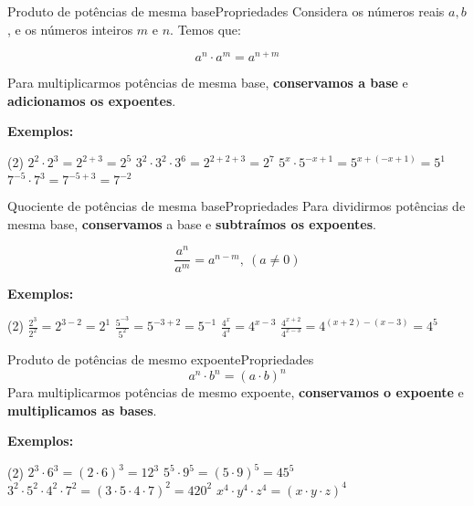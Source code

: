\documentclass[aspectratio=169,11pt]{uu-beamer}
\begin{document}
    \begin{frame}{Produto de potências de mesma base}{Propriedades}
        Considera os números reais \(a,b\), e os números inteiros \(m\) e \(n\). Temos que:
        
        \[a^n \cdot a^m = a^{n + m}\]
        
        Para multiplicarmos potências de mesma base, \textbf{conservamos a base} e \textbf{adicionamos os expoentes}.
        \vspace{.5cm}
        
        \textbf{Exemplos:}
        
        \begin{tasks}(2)
            \task \(2^2 \cdot 2^3 = 2^{2+3} = 2^5\)
            \task \(3^2 \cdot 3^2 \cdot 3^6 = 2^{2+2+3} = 2^7\)
            \task \(5^x \cdot 5^{-x+1} = 5^{x + (-x+1)} = 5^1\)
            \task \(7^{-5} \cdot 7^{3} = 7^{-5+3} = 7^{-2}\)
        \end{tasks}
        
    \end{frame}
    
    \begin{frame}{Quociente de potências de mesma base}{Propriedades}
        Para dividirmos potências de mesma base, \textbf{conservamos} a base e \textbf{subtraímos os expoentes}.
        
        \[\frac{a^n}{a^m} = a^{n-m}, ~(a \neq 0)\]
        
        \vspace{1cm}
        \textbf{Exemplos:}
        
        \begin{tasks}(2)
            \task \(\frac{2^3}{2^2} = 2^{3-2} = 2^1\)
            \task \(\frac{5^{-3}}{5^{2}} = 5^{-3+2} = 5^{-1}\)
            \task \(\frac{4^x}{4^3} = 4^{x-3}\)
            \task \(\frac{4^{x+2}}{4^{x-3}} = 4^{(x+2)-(x-3)} = 4^{5}\)
        \end{tasks}
    \end{frame}
    
    \begin{frame}{Produto de potências de mesmo expoente}{Propriedades}
        \[a^n \cdot b^n = (a \cdot b)^n\]
        Para multiplicarmos potências de mesmo expoente, \textbf{conservamos o expoente} e \textbf{multiplicamos as bases}.
        
        \vspace{1cm}
        \textbf{Exemplos:}
        
        \begin{tasks}(2)
            \task \(2^3 \cdot 6^3 = (2 \cdot 6)^3 = 12^3\)
            \task \(5^5 \cdot 9^5 = (5 \cdot 9)^5 = 45^5\)
            \task \(3^2 \cdot 5^2 \cdot 4^2 \cdot 7^2= (3 \cdot 5 \cdot 4 \cdot 7)^2 = 420^2\)
            \task \(x^4 \cdot y^4 \cdot z^4 = (x \cdot y \cdot z)^4\)
        \end{tasks}
    \end{frame}
    
\end{document}
